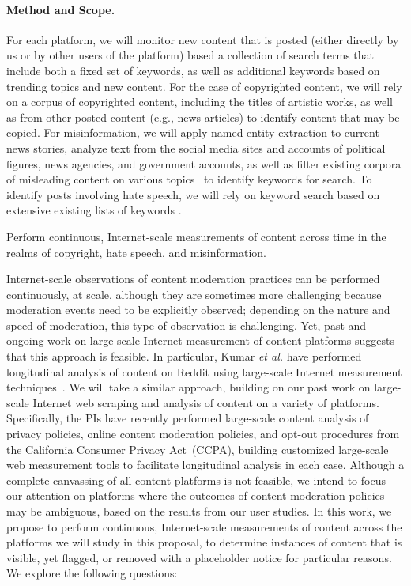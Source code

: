 \paragraph{Method and Scope.} 
For each platform, we will monitor new content that is posted 
(either directly by us or by other users of the platform) based a collection
of search terms that include both a fixed set of keywords, as well as
additional keywords based on trending topics and new content. For the case of
copyrighted content, we will rely on a corpus of copyrighted content,
including the titles of artistic works, as well as from other posted
content (e.g., news articles) to identify content that may be copied. 
For misinformation, we will apply named entity extraction to current news stories,
analyze text from the social media sites and accounts of political figures, news agencies,
and government accounts, as well as filter existing corpora of misleading content on various topics~\cite{pathak2019breaking,shahi2021exploratory} to identify keywords for search. To identify posts
involving hate speech, we will rely on keyword search based on extensive existing lists
of keywords \cite{vidgen2020directions}.

\begin{task}
    Perform continuous, Internet-scale measurements of content across time in
    the realms of copyright, hate speech, and misinformation.
\end{task}
\noindent
Internet-scale observations of content moderation practices can be performed
continuously, at scale, although they are sometimes more challenging because
moderation events need to be explicitly observed; depending on the nature and
speed of moderation, this type of observation is challenging.  
Yet, past and ongoing work on large-scale Internet measurement of content platforms
suggests that this approach is feasible. In particular, Kumar {\em et al.}
have performed longitudinal analysis of content on Reddit using large-scale
Internet measurement techniques~\cite{kumar2022understanding}. We will take a similar approach, building on
our past work on large-scale Internet web scraping and analysis of content on
a variety of platforms. Specifically, the PIs have recently performed
large-scale content analysis of privacy policies, online content moderation
policies, and opt-out procedures from the California Consumer Privacy
Act~(CCPA), building customized large-scale web measurement tools to
facilitate longitudinal analysis in each case. Although a complete canvassing
of all content platforms is not feasible, we intend to focus our attention on
platforms where the outcomes of content moderation policies may be ambiguous,
based on the results from our user studies.
In this work, we propose to perform continuous, Internet-scale measurements of
content across the platforms we will study in this proposal, to determine
instances of content that is visible, yet flagged, or removed with a
placeholder notice for particular reasons.  
We explore the following questions:

